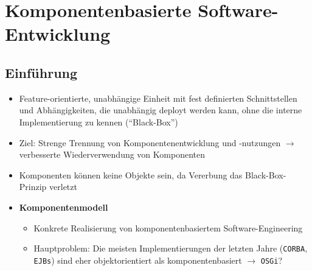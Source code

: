 \section{Komponentenbasierte Software-Entwicklung}

\subsection{Einführung}
\begin{itemize}
	\item Feature-orientierte, unabhängige Einheit mit fest definierten Schnittstellen und Abhängigkeiten, die unabhängig deployt werden kann, ohne die interne Implementierung zu kennen ("`Black-Box"')
	\item Ziel: Strenge Trennung von Komponentenentwicklung und -nutzungen \(\rightarrow\) verbesserte Wiederverwendung von Komponenten
	\item Komponenten können keine Objekte sein, da Vererbung das Black-Box-Prinzip verletzt
	\item \textbf{Komponentenmodell}
	\begin{itemize}
		\item Konkrete Realisierung von komponentenbasiertem Software-Engineering
		\item Hauptproblem: Die meisten Implementierungen der letzten Jahre (\texttt{CORBA}, \texttt{EJBs}) sind eher objektorientiert als komponentenbasiert \(\rightarrow\) \texttt{OSGi}?
	\end{itemize}
\end{itemize}


